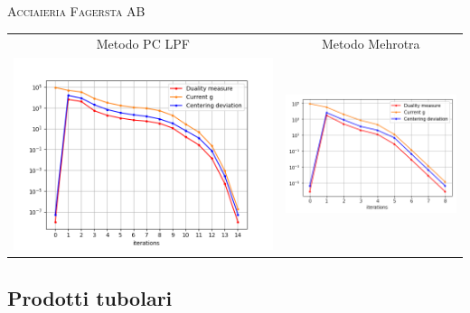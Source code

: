 \begin{frame}{\textsc{\LARGE \textcolor{iris}{Acciaieria Fagersta AB}}}
	\centering
	\begin{tabular}{c@{}c}
		\small{Metodo PC LPF} & \small{Metodo Mehrotra} \\
		\includegraphics[scale = 0.33]{swe_PCLPF}
		&\includegraphics[scale = 0.33]{swe_MER}\\ 
	\end{tabular}
\end{frame}

\subsection{Prodotti tubolari}

